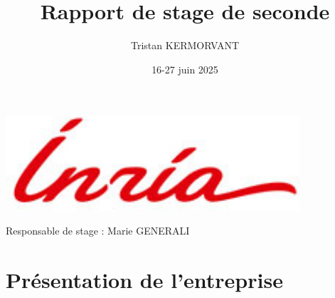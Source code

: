 \documentclass[12pt, letterpaper]{article}
\title{Rapport de stage de seconde}
\author{Tristan KERMORVANT}
\date{16-27 juin 2025}
\begin{document}
\pagestyle{fancy}
\fancyhead{} 
\fancyhead[L]{\textsc{\@author}}

\thispagestyle{empty}

\vspace*{-3cm}
\noindent {}

\vspace{4cm}

\begin{center}
    \LARGE \sc \@title
    \vskip 0.5in
    
    \includegraphics[height=35mm]{INRIA}
    
    \vskip 0.45in
    {\large \@author}
    \vfill
\end{center}

\vspace{3cm}

\begin{center}
    \normalfont
    Responsable de stage : Marie GENERALI
\end{center}

\newpage

\tableofcontents

\section{Présentation de l'entreprise}
\end{document}
